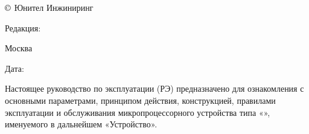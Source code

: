 \pagestyle{fancy}
\fancyhf{}
\renewcommand{\headrulewidth}{1pt}
\renewcommand{\footrulewidth}{1pt}
\lhead{\color{black}\devicecode}
\chead{\color{black}{Редакция \rev~от~\revdate}}
\rhead{\color{unigreen}\devicetype}
\lfoot{\color{unigreen}{Руководство по эксплуатации}}
\rfoot{\thepage}

\pagecolor{white}

\noindent
$\copyright$ \the\year{} Юнител Инжиниринг
\hfill
\parbox{0.3\textwidth}{\raggedleft Редакция: \textcolor{unigray}{\rev}}

\vspace{3mm}
\noindent
Москва
\hfill
\parbox{0.3\textwidth}{\raggedleft Дата: \textcolor{unigray}{\revdate}}
\vspace{5mm}

Настоящее руководство по эксплуатации (РЭ) предназначено для ознакомления с основными параметрами, принципом действия, конструкцией, правилами эксплуатации и обслуживания микропроцессорного устройства типа «\devicetype», именуемого в дальнейшем «Устройство».

